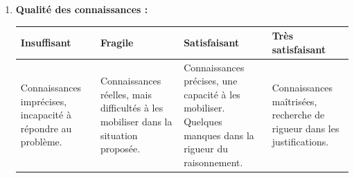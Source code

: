\documentclass[a4paper,12pt,exos]{nsi}
\begin{document}
\begin{enumerate}[label=\textbullet]
        \item 	\textbf{Qualité des connaissances :}\\[.5em]
        \begin{tabular}{|p{3.8cm}|p{3.8cm}|p{3.8cm}|p{3.8cm}|}
            \hline
            Insuffisant & Fragile & Satisfaisant & Très satisfaisant\\
            \hline
            Connaissances imprécises, incapacité à répondre au problème. &
            Connaissances réelles, mais difficultés à les mobiliser dans la situation proposée.  &
            Connaissances précises, une capacité à les mobiliser.\newline
            Quelques manques dans la rigueur du raisonnement.
     &
            Connaissances maîtrisées, recherche de rigueur dans les justifications.
    
    \\
            \hline
        \end{tabular}
    \end{enumerate}
\end{document}
